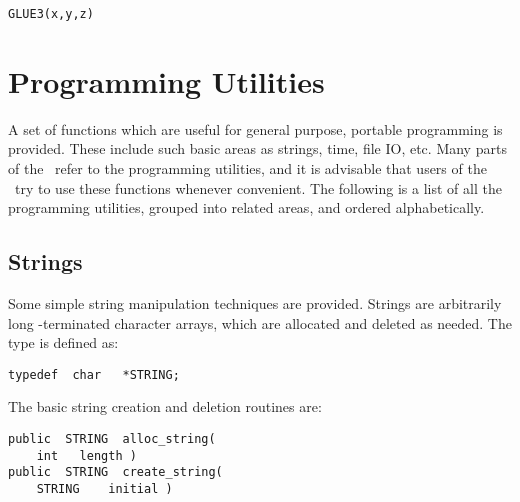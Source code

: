 
{\bf\begin{verbatim}
GLUE3(x,y,z)
\end{verbatim}}


\chapter{Programming Utilities}

A set of functions which are useful for general purpose, portable
programming is provided.  These include such basic areas as strings,
time, file IO, etc.  Many parts of the \vol\  refer
to the programming utilities, and it is advisable that users of the
\vol\  try to use these functions whenever convenient.
The following is a list of all the programming utilities, grouped into
related areas, and ordered alphabetically.

\section{Strings}

Some simple string manipulation techniques are provided.  Strings are
arbitrarily long -terminated character arrays, which are
allocated and deleted as needed.  The type  is defined as:

{\bf\begin{verbatim}
typedef  char   *STRING;
\end{verbatim}}

The basic string creation and deletion routines are:

{\bf\begin{verbatim}
public  STRING  alloc_string(
    int   length )
public  STRING  create_string(
    STRING    initial )
\end{verbatim}}


